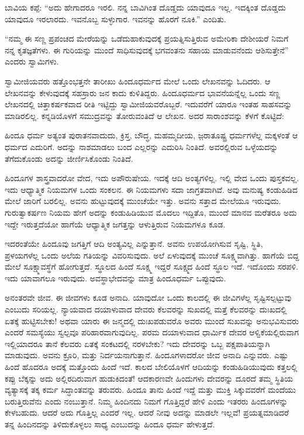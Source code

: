  ಬಾವಿಯ ಕಪ್ಪೆ: “ಅದು ಹೇಗಾದರೂ ಇರಲಿ. ನನ್ನ ಬಾವಿಗಿಂತ ದೊಡ್ಡದು ಯಾವುದೂ ಇಲ್ಲ. ಇದಕ್ಕಿಂತ ದೊಡ್ಡದು ಯಾವುದೂ ಇರಲಾರದು. ಇವನೊಬ್ಬ ಸುಳ್ಳುಗಾರ. ಇವನನ್ನು ಹೊರಗೆ ನೂಕಿ.” ಎಂದಿತು. 

 “ನಮ್ಮ ಈ ಸಣ್ಣ ಪ್ರಪಂಚದ ಮೇರೆಯನ್ನು ಒಡೆದುಹಾಕುವುದಕ್ಕೆ ಪ್ರಯತ್ನಿಸುತ್ತಿರುವ ಅಮೇರಿಕಾ ದೇಶೀಯರೆ ನಿಮಗೆ ನನ್ನ ಕೃತಜ್ಞತೆಗಳು. ಈ ಗುರಿಯನ್ನು ಮುಂದೆ ಸಾಧಿಸುವುದಕ್ಕೆ ಭಗವಂತನು ಸಹಾಯ ಮಾಡುವನೆಂದು ಆಶಿಸುತ್ತೇನೆ” ಎಂದರು ಸ್ವಾಮಿಗಳು. 

 ಸ್ವಾಮೀಜಿಯವರು ಹತ್ತೊಂಭತ್ತನೇ ತಾರೀಖು ಹಿಂದೂಧರ್ಮದ ಮೇಲೆ ಒಂದು ಲೇಖನವನ್ನು ಓದಿದರು. ಆ ಲೇಖನವನ್ನು ಕೇಳುವುದಕ್ಕೆ ಸಹಸ್ರಾರು ಜನ ಕಾದು ಕುಳಿತಿದ್ದರು. ಹಿಂದೂಧರ್ಮದ ಭಾವನೆಯನ್ನೆಲ್ಲ ಒಂದು ಸಣ್ಣ ಲೇಖನದಲ್ಲಿ ಚಿತ್ತಾಕರ್ಷಕವಾದ ರೀತಿ ಇಟ್ಟಿದ್ದು ಸ್ವಾಮೀಜಿಯವರೊಬ್ಬರೆ. ಇದುವರೆಗೆ ಯಾರೂ ಇಂತಹ ಸಾಹಸವನ್ನು ಮಾಡಿರಲಿಲ್ಲ. ಕನ್ನಡಿಯೊಳಗೆ ಸಮುದ್ರವನ್ನು ತೋರುವಂತಿದೆ ಆ ಲೇಖನ. ಅದರ ಸಾರಾಂಶವನ್ನು ಕೆಳಗೆ ಕೊಟ್ಟಿದೆ: 

 ಹಿಂದೂ ಧರ್ಮ ಅತ್ಯಂತ ಪುರಾತನವಾದುದು, ಕ್ರಿಸ್ತ, ಬೌದ್ಧ, ಮಹಮ್ಮದೀಯ, ಜ಼ರಾತೂಷ್ಟ್ರ ಧರ್ಮಗಳೆಲ್ಲ ಮಕ್ಕಳಂತೆ ಆ ಧರ್ಮದ ಎದುರಿಗೆ. ಅದನ್ನು ನಾಶಮಾಡಲು ಬಂದ ಎಲ್ಲರನ್ನು ಎದುರಿಸಿ ನಿಂತಿದೆ. ಅವರಲ್ಲಿರುವ ಒಳ್ಳೆಯದನ್ನು ತೆಗೆದುಕೊಂಡು ಅದನ್ನು ಜೀರ್ಣಿಸಿಕೊಂಡು ನಿಂತಿದೆ. 

 ಹಿಂದೂಗಳ ಶಾಸ್ತ್ರವಾದರೋ ವೇದ, ಇದು ಅಪೌರುಷೇಯ. ಇದಕ್ಕೆ ಆದಿ ಅಂತ್ಯಗಳಿಲ್ಲ. ಇಲ್ಲಿ ವೇದ ಒಂದು ಪುಸ್ತಕವಲ್ಲ. ಇದು ಆಧ್ಯಾತ್ಮಿಕ ನಿಯಮಗಳ ಒಂದು ಸಂಕಲನ. ಈ ನಿಯಮಗಳು ಸದಾ ಜಾಗ್ರತವಾಗಿವೆ. ಅವು ಮನುಷ್ಯ ಕಂಡುಹಿಡಿದ ಮೇಲೆ ಜಾರಿಗೆ ಬರಲಿಲ್ಲ. ಅವನು ಹುಟ್ಟುವುದಕ್ಕೆ ಮುಂಚೆಯೇ ಇತ್ತು. ಅವನು ಸತ್ತಾದ ಮೇಲೆಯೂ ಇರುವುದು. ಗುರುತ್ವಾಕರ್ಷಣ ನಿಯಮ ಹೇಗೆ ಅದನ್ನು ಕಂಡುಹಿಡಿಯುವ ಮೊದಲು ಇದ್ದಿತೊ, ಮುಂದೆ ಮಾನವ ಮರೆತರೂ ಅದು ಇದ್ದೇ ಇರುತ್ತದೆಯೋ ಹಾಗೆಯೆ ಆಧ್ಯಾತ್ಮಿಕ ಜಗತ್ತನ್ನು ಆಳುತ್ತಿರುವ ನಿಯಮಗಳೂ ಕೂಡ. 

 ಇದರಂತೆಯೇ ಹಿಂದೂವು ಜಗತ್ತಿಗೆ ಆದಿ ಅಂತ್ಯವಿಲ್ಲ ಎನ್ನುತ್ತಾನೆ. ಅವನು ಉಪಯೋಗಿಸುವ ಸೃಷ್ಟಿ, ಸ್ಥಿತಿ, ಪ್ರಳಯಗಳೆಲ್ಲ ಒಂದು ಅಲೆಯ ಗತಿಯನ್ನು ವಿವರಿಸುವುದು. ಅಲೆ ಏಳುವುದಕ್ಕೆ ಮುಂಚೆ ಸೂಕ್ಷ್ಮವಾಗಿತ್ತು. ಹಾಗೆಯೆ ಬಿದ್ದ ಮೇಲೆ ಸೂಕ್ಷ್ಮಾವಸ್ಥೆಗೆ ಹೋಗುತ್ತದೆ. ಸ್ಥೂಲದ ಹಿಂದೆ ಸೂಕ್ಷ್ಮ ಇದ್ದರೆ ಸೂಕ್ಷ್ಮದ ಹಿಂದೆ ಸ್ಥೂಲ ಇದೆ. ಇದೊಂದು ಸರಪಳಿ. ಇದು ಯಾವಾಗಲೂ ಇರುವುದು. ಅವಸ್ಥಾಭೇದವನ್ನು ಮಾತ್ರ ಹಿಂದೂಧರ್ಮ ಒಪ್ಪುವುದು. 

 ಅನಂತರವೇ ಜೀವ. ಈ ಜೀವಗಳು ಕೂಡ ಅನಾದಿ. ಯಾವುದೋ ಒಂದು ಕಾಲದಲ್ಲಿ ಈ ಜೀವಿಗಳೆಲ್ಲ ಸೃಷ್ಟಿಸಲ್ಪಟ್ಟುವು ಎಂಬುದು ಸರಿಯಲ್ಲ. ನ್ಯಾಯವಾದ ದಯಾಳುವಾದ ದೇವರು ಕೆಲವರನ್ನು ಸುಖದಲ್ಲಿ ಮತ್ತೆ ಕೆಲವರನ್ನು ದುಃಖದಲ್ಲಿ ಏತಕ್ಕೆ ಹುಟ್ಟಿಸಬೇಕು! ಅಥವಾ ಯಾರು ಈ ಜನ್ಮದಲ್ಲಿ ದುಃಖಪಡುವರೊ ಅವರು ಮುಂದೆ ಸುಖವನ್ನು ಅನುಭವಿಸುವರು ಎಂದರೆ ಸಮಸ್ಯೆಯು ಸ್ವಲ್ಪವೂ ಪರಿಹಾರವಾಗುವುದಿಲ್ಲ. ಪರಮ ದಯಾಳುವಾದ ಧಾರ್ಮಿಕ ದೇವರ ಆಳ್ವಿಕೆಯಲ್ಲಿರುವಾಗ ಇಲ್ಲಿಯಾದರೂ ತಾನೆ ಕೆಲವರು ಏತಕ್ಕೆ ಸಂಕಟದಲ್ಲಿ ನರಳಬೇಕು? ಇದು ದೇವರನ್ನು ಒಬ್ಬ ಪಕ್ಷಪಾತಿಯನ್ನಾಗಿ ಮಾಡುವುದು. ಅವನು ಕ್ರೂರಿ, ಮತ್ತು ನಿರ್ದಯನಾಗುತ್ತಾನೆ. ಹಿಂದೂಗಳಾದರೋ ಜೀವ ಅನಾದಿ ಎನ್ನುವರು. ಎಷ್ಟು ಹಿಂದೆ ಹೊದರೂ ಅದಕ್ಕೆ ಮತ್ತೊಂದು ಹಿಂದೆ ಇದೆ. ಕಾಲದ ಬೇಲಿಯೊಳಗೆ ಆದಿಯನ್ನು ಕಂಡುಹಿಡಿಯುವುದು ಕತ್ತಲಲ್ಲಿ ಕಪ್ಪು ಬೆಕ್ಕನ್ನು ಅದು ಅಲ್ಲಿರದಿರುವಾಗ ಹುಡುಕಿದಂತೆ! ಆದಕಾರಣವೇ ಹಿಂದುಗಳು ದೇವರನ್ನು ದೂರದೆ ತಮ್ಮ ಸ್ಥಿತಿಯ ವ್ಯತ್ಯಾಸಕ್ಕೆ ತಕ್ಕ ಕರ್ಮ ಸಿದ್ಧಾಂತವನ್ನು ತರುವರು. ಹಿಂದೂ ತಾನು ಹಿಂದೆ ಇದ್ದೆ ಮತ್ತು ಮುಕ್ತಿ ಸಿಕ್ಕುವವರೆಗೆ ಮಂದೆಯು ಬರುತ್ತಿರುವೆನು ಎಂದು ನಂಬುತ್ತಾನೆ. ನಿಮ್ಮ ಹಿಂದಿನದು ನಿಮಗೆ ಗೊತ್ತಿದ್ದರೆ ಹೇಳಿ ಎಂದು ಇತರರು ಹಿಂದೂಗಳನ್ನು ಕೇಳಬಹುದು. ಆದರೆ ಅದು ಗೊತ್ತಿಲ್ಲ ಎಂದರೆ ಇಲ್ಲ. ಆದರೆ ನೀವು ಅದನ್ನು ಮಾಡಲೇ ಇಲ್ಲವೆ! ಪ್ರಯತ್ನಮಾಡಿದರೆ ತನ್ನ ಹಿಂದಿನದನ್ನು ತಿಳಿದುಕೊಳ್ಳಲು ಸಾಧ್ಯ ಎಂಬುದನ್ನು ಹಿಂದೂ ಧರ್ಮ ಹೇಳುತ್ತದೆ. 

